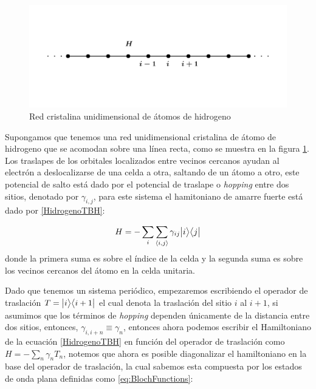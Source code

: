    \begin{figure}[h!]
        \centering
        \includegraphics[width=\textwidth]{Imagenes/Models/TB_example.pdf}\vspace{-1.5cm}
        \caption{Red cristalina unidimensional de átomos de hidrogeno}
        \label{fig:Hidrogen_chain}
    \end{figure}
    
    Supongamos que tenemos una red unidimensional cristalina de átomo de hidrogeno que se acomodan sobre una línea recta, como se muestra en la figura \ref{fig:Hidrogen_chain}. Los traslapes de los orbitales localizados entre vecinos cercanos ayudan al electrón a deslocalizarse de una celda a otra, saltando de un átomo a otro, este potencial de salto está dado por el potencial de traslape o \textit{hopping} entre dos sitios, denotado por $\gamma_{i,j}$, para este sistema el hamitoniano de amarre fuerte está dado por \eqref{HidrogenoTBH}:

    \begin{equation}
        \label{HidrogenoTBH}
        H =  -\sum_{i}\sum_{\langle i, j \rangle } \gamma_{ij} \big |{i}\big \rangle\big \langle{j}\big |
    \end{equation}
    donde la primera suma es sobre el índice de la celda y la segunda suma es sobre los vecinos cercanos del átomo en la celda unitaria.
    
    Dado que tenemos un sistema periódico, empezaremos escribiendo el operador de traslación $T = \big |{i}\big \rangle\big \langle{i+1}\big |$ el cual denota la traslación del sitio $i$ al $i+1$, si asumimos que los términos de {\it hopping} dependen únicamente de la distancia entre dos sitios, entonces, $\gamma_{i,i+n} \equiv \gamma_{n}$, entonces ahora podemos escribir el Hamiltoniano de la ecuación \ref{HidrogenoTBH} en función del operador de traslación como $H = -\sum_n \gamma_n T_n$, notemos que ahora es posible diagonalizar el hamiltoniano en la base del operador de traslación, la cual sabemos esta compuesta por los estados de onda plana definidas como \eqref{eq:BlochFunctions}:


